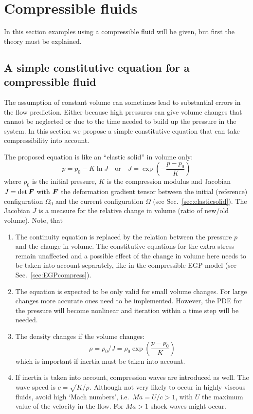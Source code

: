 
\def\headdate{17th February 2025}

\section{Compressible fluids}
\label{sec:compressible}

In this section examples using a compressible fluid will be
given, but first the theory must be explained.

\subsection{A simple constitutive equation for a compressible fluid}

The assumption of constant volume can sometimes lead to
substantial errors in the flow prediction. Either because high pressures can
give volume changes that cannot be neglected or due to the time needed to build
up the pressure in the system.
In this section we propose a simple constitutive equation
that can take compressibility into account. 

The proposed equation is like an ``elastic solid'' in volume only:
\begin{equation}
   p = p_0 - K\ln J\quad\text{or}\quad J=\exp(-\frac{p-p_0}{K})
   \label{eq:compress1}
\end{equation}
where $p_0$ is the initial pressure, $K$ is the compression modulus and
Jacobian $J=\det\boldsymbol{F}$ with $\boldsymbol{F}$ the deformation gradient tensor
between the initial (reference) configuration
$\Omega_0$ and the current configuration $\Omega$ (see
Sec.~\ref{sec:elasticsolid}). The Jacobian $J$ is a measure for the relative
change in volume (ratio of new/old volume).
Note, that
\begin{enumerate}
   \item The continuity equation is replaced by the relation
         between the pressure $p$ and the change in volume.
         The constitutive equations for the extra-stress remain unaffected and
         a possible effect of the change in volume here needs to be taken into
         account separately, like in the compressible EGP model (see Sec.~\ref{sec:EGPcompress}).
   \item The equation is expected to be only valid for small volume changes.
For large changes more accurate ones need to be implemented. However, the PDE for the pressure will become nonlinear and iteration within a time step will be needed.
   \item The density changes if the volume changes:
\[
        \rho = \rho_0 / J = \rho_0 \exp(\frac{p-p_0}{K})
\]
which is important if inertia must be taken into account.
   \item If inertia is taken into account, compression waves are introduced as
well. The wave speed is $c=\sqrt{K/\rho}$. Although not very likely to occur
in highly viscous fluids, avoid high `Mach numbers', i.e.\ $Ma=U/c>1$, with $U$ 
the maximum value of the velocity in the flow. For $Ma>1$ shock waves
might occur.
\end{enumerate}

